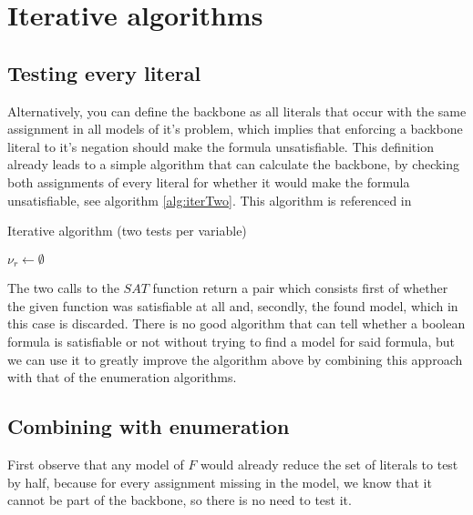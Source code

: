 \section{Iterative algorithms}
\label{sec:iterative}
\subsection{Testing every literal}
Alternatively, you can define the backbone as all literals that occur with the same assignment in all models of it's problem, which implies that enforcing a backbone literal to it's negation should make the formula unsatisfiable. This definition already leads to a simple algorithm that can calculate the backbone, by checking both assignments of every literal for whether it would make the formula unsatisfiable, see algorithm \ref{alg:iterTwo}. This algorithm is referenced in \cite{mjl10}
\begin{algorithm}
\caption{{\sc Iterative algorithm (two tests per variable)}}
\label{alg:iterTwo}
\DontPrintSemicolon
{}
$\nu_r \gets \emptyset$\;
\;
\end{algorithm}

The two calls to the $SAT$ function return a pair which consists first of whether the given function was satisfiable at all and, secondly, the found model, which in this case is discarded. There is no good algorithm that can tell whether a boolean formula is satisfiable or not without trying to find a model for said formula, but we can use it to greatly improve the algorithm above by combining this approach with that of the enumeration algorithms.

\subsection{Combining with enumeration}
First observe that any model of $F$ would already reduce the set of literals to test by half, because for every assignment missing in the model, we know that it cannot be part of the backbone, so there is no need to test it. 

